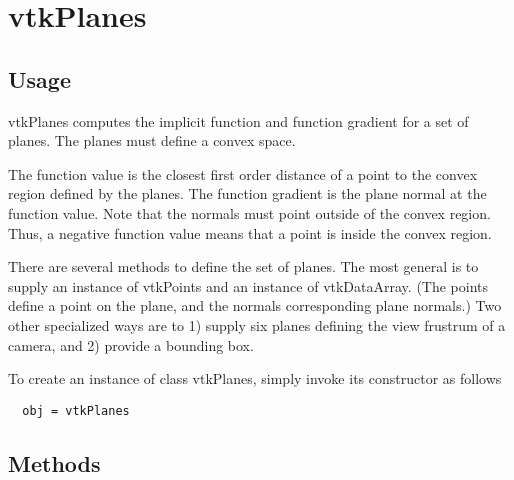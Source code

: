 \section{vtkPlanes}

\subsection{Usage}

 vtkPlanes computes the implicit function and function gradient for a set
 of planes. The planes must define a convex space.

 The function value is the closest first order distance of a point to the
 convex region defined by the planes. The function gradient is the plane
 normal at the function value.  Note that the normals must point outside of
 the convex region. Thus, a negative function value means that a point is
 inside the convex region.

 There are several methods to define the set of planes. The most general is
 to supply an instance of vtkPoints and an instance of vtkDataArray. (The 
 points define a point on the plane, and the normals corresponding plane 
 normals.) Two other specialized ways are to 1) supply six planes defining 
 the view frustrum of a camera, and 2) provide a bounding box.

To create an instance of class vtkPlanes, simply
invoke its constructor as follows
\begin{verbatim}
  obj = vtkPlanes
\end{verbatim}
\subsection{Methods}

